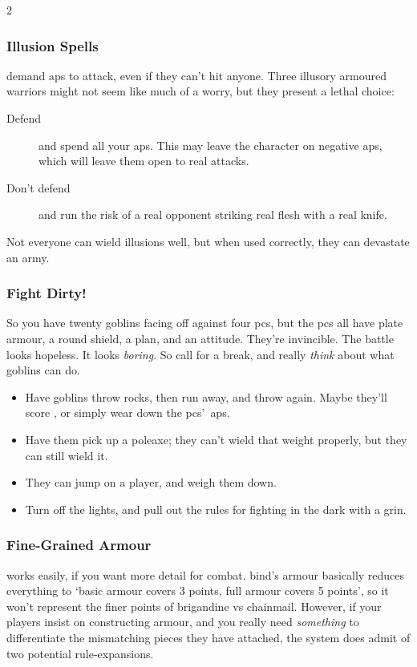 \begin{multicols}{2}
\subsubsection{Illusion Spells}
demand \glspl{ap} to attack, even if they can't hit anyone.
Three illusory armoured warriors might not seem like much of a worry, but they present a lethal choice:

\begin{description}
  \item[Defend]
  and spend all your \glspl{ap}.
  This may leave the character on negative \glspl{ap}, which will leave them open to real attacks.
  \item[Don't defend]
  and run the risk of a real opponent striking real flesh with a real knife. 
\end{description}

Not everyone can wield illusions well, but when used correctly, they can devastate an army.

\subsubsection{Fight Dirty!}
So you have twenty goblins facing off against four \glspl{pc}, but the \glspl{pc} all have plate armour, a round shield, a plan, and an attitude.
They're invincible.
The battle looks hopeless.
It looks \emph{boring}.
So call for a break, and really \emph{think} about what goblins can do.

\begin{itemize}
  \item
  Have goblins throw rocks, then run away, and throw again.
  Maybe they'll score , or simply wear down the \glspl{pc}'~\glspl{ap}.
  \item
  Have them pick up a poleaxe; they can't wield that weight properly, but they can still wield it.
  \item
  They can jump on a player, and weigh them down.
  \item
  Turn off the lights, and pull out the rules for fighting in the dark with a grin.%
\end{itemize}

\subsubsection{Fine-Grained Armour}
works easily, if you want more detail for combat.
\Gls{bind}'s armour basically reduces everything to `basic armour covers 3 points, full armour covers 5 points', so it won't represent the finer points of brigandine vs chainmail.
However, if your players insist on constructing armour, and you really need \emph{something} to differentiate the mismatching pieces they have attached, the system does admit of two potential rule-expansions.


\end{multicols}
